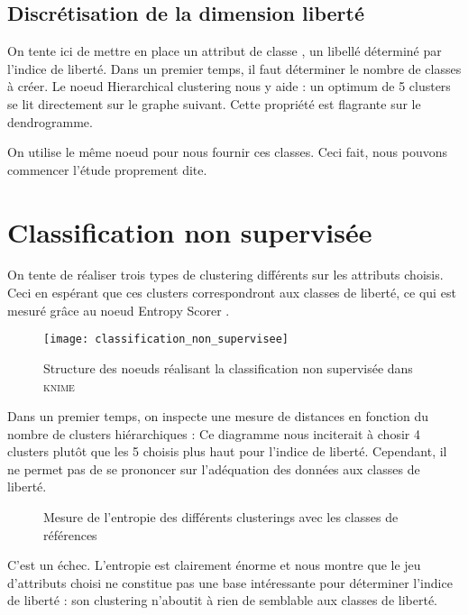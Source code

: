 \subsection{Discrétisation de la dimension \og liberté \fg}
On tente ici de mettre en place un attribut de \og classe \fg, un libellé déterminé par l'indice de liberté. Dans un premier temps, il faut déterminer le nombre de classes à créer. Le noeud \og Hierarchical clustering \fg nous y aide : un optimum de 5 clusters se lit directement sur le graphe suivant.
Cette propriété est flagrante sur le dendrogramme.

On utilise le même noeud pour nous fournir ces classes. Ceci fait, nous pouvons commencer l'étude proprement dite.

\section{Classification non supervisée}
On tente de réaliser trois types de clustering différents sur les attributs choisis. Ceci en espérant que ces clusters correspondront aux classes de liberté, ce qui est mesuré grâce au noeud \og Entropy Scorer \fg.

\begin{figure}[H]
	\centering
	\texttt{[image: classification\_non\_supervisee]}
	\caption{Structure des noeuds réalisant la classification non supervisée dans \textsc{knime}}
\end{figure}

Dans un premier temps, on inspecte une mesure de distances en fonction du nombre de clusters hiérarchiques :
Ce diagramme nous inciterait à chosir 4 clusters plutôt que les 5 choisis plus haut pour l'indice de liberté. Cependant, il ne permet pas de se prononcer sur l'adéquation des données aux classes de liberté.

\begin{figure}[H]
	\centering
	\caption{Mesure de l'entropie des différents clusterings avec les classes de références}
\end{figure}
C'est un échec. L'entropie est clairement énorme et nous montre que le jeu d'attributs choisi ne constitue pas une base intéressante pour déterminer l'indice de liberté : son clustering n'aboutit à rien de semblable aux classes de liberté.

